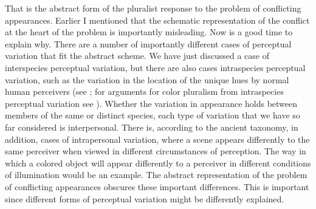 \documentclass[12pt]{article}
\begin{document}
That is the abstract form of the pluralist response to the problem of conflicting appearances. Earlier I mentioned that the schematic representation of the conflict at the heart of the problem is importantly misleading. Now is a good time to explain why. There are a number of importantly different cases of perceptual variation that fit the abstract scheme. We have just discussed a case of interspecies perceptual variation, but there are also cases intraspecies perceptual variation, such as the variation in the location of the unique hues by normal human perceivers (see \citealt{Leon-M.-Hurvich:1968fu,Hardin:1993kn,Tye:2006lr,Cohen:2006fj,Tye:2006yq,Byrne:2007qy,Cohen:2007kx,Tye:2007fk,Kalderon:2006tg}; for arguments for color pluralism from intraspecies perceptual variation see \citealt{Byrne:1997dk,tye00,Mizrahi:2006zr,Kalderon:2006tg}). Whether the variation in appearance holds between members of the same or distinct species, each type of variation that we have so far considered is interpersonal. There is, according to the ancient taxonomy, in addition, cases of intrapersonal variation, where a scene appears differently to the same perceiver when viewed in different circumstances of perception. The way in which a colored object will appear differently to a perceiver in different conditions of illumination would be an example. The abstract representation of the problem of conflicting appearances obscures these important differences. This is important since different forms of perceptual variation might be differently explained. 
\end{document}
